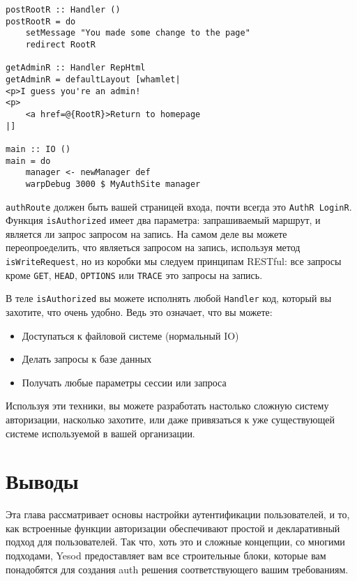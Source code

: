 \begin{lstlisting}
postRootR :: Handler ()
postRootR = do
    setMessage "You made some change to the page"
    redirect RootR

getAdminR :: Handler RepHtml
getAdminR = defaultLayout [whamlet|
<p>I guess you're an admin!
<p>
    <a href=@{RootR}>Return to homepage
|]

main :: IO ()
main = do
    manager <- newManager def
    warpDebug 3000 $ MyAuthSite manager
\end{lstlisting}

\lstinline'authRoute' должен быть вашей страницей входа, почти всегда это \lstinline'AuthR LoginR'. Функция \lstinline'isAuthorized' имеет два параметра: запрашиваемый маршрут, и является ли запрос запросом на запись. На самом деле вы можете переопроеделить, что являеться запросом на запись, используя метод \lstinline'isWriteRequest', но из коробки мы следуем принципам RESTful: все запросы кроме \lstinline'GET', \lstinline'HEAD', \lstinline'OPTIONS' или \lstinline'TRACE' это запросы на запись.

В теле \lstinline'isAuthorized' вы можете исполнять любой \lstinline'Handler' код, который вы захотите, что очень удобно. Ведь это означает, что вы можете:

\begin{itemize}
    \item Доступаться к файловой системе (нормальный IO)

    \item Делать запросы к базе данных

    \item Получать любые параметры сессии или запроса
\end{itemize}

Используя эти техники, вы можете разработать настолько сложную систему авторизации, насколько захотите, или даже привязаться к уже существующей системе используемой в вашей организации.

\section{Выводы}

Эта глава рассматривает основы настройки аутентификации пользователей, и то, как встроенные функции авторизации обеспечивают простой и декларативный подход для пользователей. Так что, хоть это и сложные концепции, со многими подходами, Yesod предоставляет вам все строительные блоки, которые вам понадобятся для создания auth решения соответствующего вашим требованиям.
